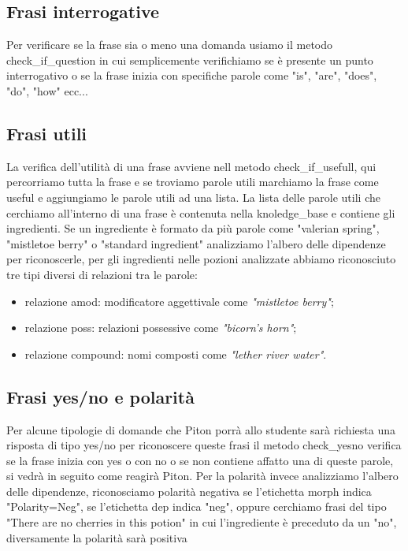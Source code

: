 \subsection{Frasi interrogative}
Per verificare se la frase sia o meno una domanda usiamo il metodo check\_if\_question in cui semplicemente verifichiamo se è presente un punto interrogativo o se la frase inizia con specifiche parole come "is", "are", "does", "do", "how" ecc...
\subsection{Frasi utili}
La verifica dell'utilità di una frase avviene nell metodo check\_if\_usefull, qui percorriamo tutta la frase e se troviamo parole utili  marchiamo la frase come useful e aggiungiamo le parole utili ad una lista. La lista delle parole utili che cerchiamo all'interno di una frase è contenuta nella knoledge\_base e contiene gli ingredienti. Se un ingrediente è formato da più parole come "valerian spring", "mistletoe berry" o  "standard ingredient" analizziamo l'albero delle dipendenze per riconoscerle, per gli ingredienti nelle pozioni analizzate abbiamo riconosciuto tre tipi diversi di relazioni tra le parole:
\begin{itemize}
    \item relazione amod: modificatore aggettivale come \textit{"mistletoe berry"};
    \item relazione poss: relazioni possessive come \textit{"bicorn's horn"};
    \item relazione compound: nomi composti come \textit{"lether river water"}.
\end{itemize}
\subsection{Frasi yes/no e polarità}
Per alcune tipologie di domande che Piton porrà allo studente sarà richiesta una risposta di tipo yes/no per riconoscere queste frasi il metodo check\_yesno verifica se la frase inizia con yes o con no o se non contiene affatto una di queste parole, si vedrà in seguito come reagirà Piton.
Per la polarità invece analizziamo l'albero delle dipendenze, riconosciamo polarità negativa se l'etichetta morph indica "Polarity=Neg", se l'etichetta dep indica "neg", oppure cerchiamo frasi del tipo "There are no cherries in this potion" in cui l'ingrediente è preceduto da un "no", diversamente la polarità sarà positiva
